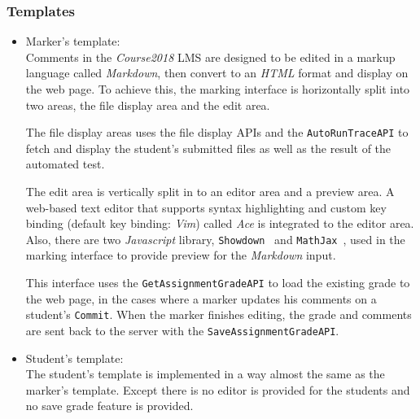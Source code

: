 \subsubsection{Templates}
    \begin{itemize}
        \item Marker's template: \\
        Comments in the \emph{Course2018} LMS are designed to be edited in
        a markup language called \emph{Markdown}, then convert to an \emph{HTML}
        format and display on the web page.
        To achieve this, the marking interface is horizontally
        split into two areas, the file display area and the edit area.

        The file display areas uses the file display APIs and the 
        \texttt{AutoRunTraceAPI}
        to fetch and display the student's submitted files as well
        as the result of the automated test.

        The edit area is vertically split in to an editor area and a
        preview area. A web-based text editor that supports syntax highlighting
        and custom key binding (default key binding: \emph{Vim})
        called \emph{Ace} \cite{aceEditor} is integrated to the editor area.
        Also, there are two \emph{Javascript} library,
        \texttt{Showdown}~\cite{showdown} and \texttt{MathJax}~\cite{mathjax},
        used in the marking interface to provide preview for the \emph{Markdown}
        input.

        This interface uses the \texttt{GetAssignmentGradeAPI} to load the
        existing grade to the web page, in the cases where a marker updates
        his comments on a student's \texttt{Commit}. When the marker finishes
        editing, the grade and comments are sent back to the server with the
        \texttt{SaveAssignmentGradeAPI}.

        \item Student's template: \\
        The student's template is implemented in a way almost the same as the
        marker's template. Except there is no editor is provided for the
        students and no save grade feature is provided.
    \end{itemize}
